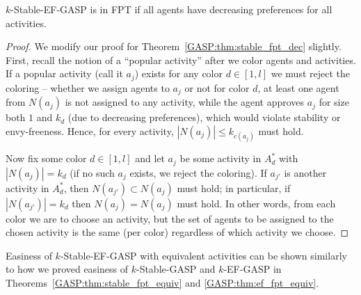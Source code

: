 \begin{theorem} \label{GASP:thm:stable_ef_dec_fpt}
$k$-Stable-EF-GASP is in FPT if all agents have decreasing preferences for all activities. 
\end{theorem} 
\begin{proof} 
We modify our proof for Theorem~\ref{GASP:thm:stable_fpt_dec} slightly.
First, recall the notion of a ``popular activity'' after we color agents and activities. If a popular activity (call it $a_j$) exists for any color $d\in [1,l]$ we must reject the coloring -- whether we assign agents to $a_j$ or not for color $d$, at least one agent from $N(a_j)$ is not assigned to any activity, while the agent approves $a_j$ for size both $1$ and $k_d$ (due to decreasing preferences), which would violate stability or envy-freeness. Hence, for every activity, $|N(a_j)| \leq k_{c(a_j)}$ must hold. 

Now fix some color $d\in [1,l]$ and let $a_j$ be some activity in $A^*_d$ with $|N(a_j)| = k_d$ (if no such $a_j$ exists, we reject the coloring). If $a_{j'}$ is another activity in $A^*_d$, then $N(a_{j'}) \subset N(a_j)$ must hold; in particular, if $|N(a_{j'})| = k_d$ then $N(a_{j}) = N(a_j)$ must hold. In other words, from each color we are to choose an activity, but the set of agents to be assigned to the chosen activity is the same (per color) regardless of which activity we choose. 
	
	
\end{proof}


Easiness of $k$-Stable-EF-GASP with equivalent activities can be shown similarly to how we proved easiness of $k$-Stable-GASP and $k$-EF-GASP in Theorems~\ref{GASP:thm:stable_fpt_equiv} and \ref{GASP:thm:ef_fpt_equiv}.

